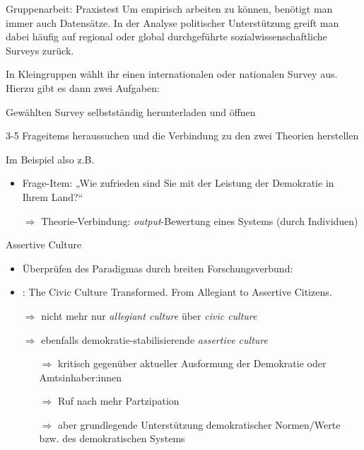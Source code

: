 \documentclass[11pt]{beamer}
\begin{document}
\begin{frame}[t]{Gruppenarbeit: Praxistest}
Um empirisch arbeiten zu können, benötigt man immer auch Datensätze. In der Analyse politischer Unterstützung greift man dabei häufig auf regional oder global durchgeführte sozialwissenschaftliche Surveys zurück. \pause

In Kleingruppen wählt ihr einen internationalen oder nationalen Survey aus. Hierzu gibt es dann zwei Aufgaben: 
\begin{nolist}
	\item Gewählten Survey selbstständig herunterladen und öffnen
	\item 3-5 Frageitems heraussuchen und die Verbindung zu den zwei Theorien herstellen \pause
\end{nolist}

Im Beispiel also z.B. 
\begin{itemize}
	\item Frage-Item: „Wie zufrieden sind Sie mit der Leistung der Demokratie in Ihrem Land?“
	\item[$\Rightarrow$] Theorie-Verbindung: \textit{output}-Bewertung eines Systems (durch Individuen)
\end{itemize}

\end{frame}



\begin{frame}[t]{Assertive Culture}
\begin{itemize}
	\item Überprüfen des Paradigmas durch breiten Forschungsverbund:
	\item \cite{Dalton2014b}: The Civic Culture Transformed. From Allegiant to Assertive Citizens. \pause
	\item[$\Rightarrow$] nicht mehr nur \textit{allegiant culture} über \textit{civic culture} \pause
	\item[$\Rightarrow$] ebenfalls demokratie-stabilisierende \textit{assertive culture} \pause
	\begin{itemize}
		\item[$\Rightarrow$] kritisch gegenüber aktueller Ausformung der Demokratie oder Amtsinhaber:innen 
		\item[$\Rightarrow$] Ruf nach mehr Partzipation
		\item[$\Rightarrow$] aber grundlegende Unterstützung demokratischer Normen/Werte bzw. des demokratischen Systems 
	\end{itemize}
\end{itemize}
\end{frame}
\end{document}
